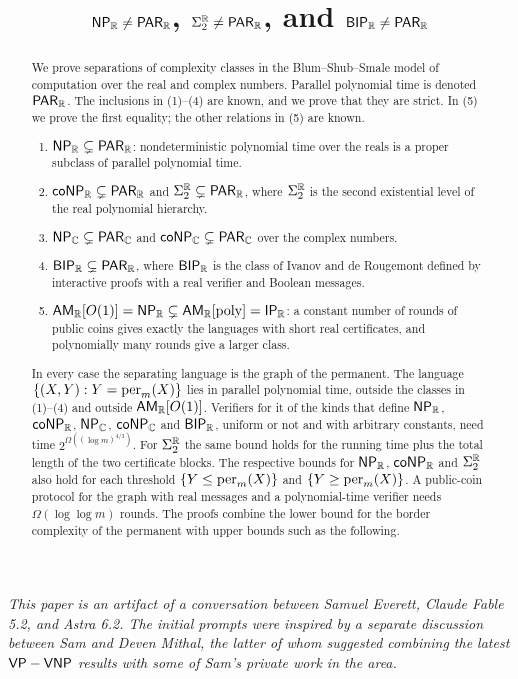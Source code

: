 \documentclass[11pt]{amsart}
\title{$\textsf{\upshape NP}_{\mathbb{R}}\neq\textsf{\upshape PAR}_{\mathbb{R}}$, $\Sigma_2^{\mathbb{R}}\neq\textsf{\upshape PAR}_{\mathbb{R}}$, and $\textsf{\upshape BIP}_{\mathbb{R}}\neq\textsf{\upshape PAR}_{\mathbb{R}}$}
\date{}
\theoremstyle{plain}
\theoremstyle{definition}
\theoremstyle{remark}
\begin{document}
\textit{This paper is an artifact of a conversation between Samuel Everett, Claude Fable 5.2, and Astra 6.2. The initial prompts were inspired by a separate discussion between Sam and Deven Mithal, the latter of whom suggested combining the latest $\textsf{\upshape VP}-\textsf{\upshape VNP}$ results with some of Sam's private work in the area.}

\begin{abstract}
We prove separations of complexity classes in the Blum--Shub--Smale model of computation over the real and complex numbers. Parallel polynomial time is denoted $\textsf{\upshape PAR}_{\mathbb{R}}$. The inclusions in \textup{(1)--(4)} are known, and we prove that they are strict. In \textup{(5)} we prove the first equality; the other relations in \textup{(5)} are known.
\begin{enumerate}[label=\textup{(\arabic*)},leftmargin=2.2em,itemsep=1pt,topsep=3pt]
\item $\textsf{\upshape NP}_{\mathbb{R}}\subsetneq\textsf{\upshape PAR}_{\mathbb{R}}$: nondeterministic polynomial time over the reals is a proper subclass of parallel polynomial time.
\item $\textsf{\upshape coNP}_{\mathbb{R}}\subsetneq\textsf{\upshape PAR}_{\mathbb{R}}$ and $\Sigma_2^{\mathbb{R}}\subsetneq\textsf{\upshape PAR}_{\mathbb{R}}$, where $\Sigma_2^{\mathbb{R}}$ is the second existential level of the real polynomial hierarchy.
\item $\textsf{\upshape NP}_{\mathbb{C}}\subsetneq\textsf{\upshape PAR}_{\mathbb{C}}$ and $\textsf{\upshape coNP}_{\mathbb{C}}\subsetneq\textsf{\upshape PAR}_{\mathbb{C}}$ over the complex numbers.
\item $\textsf{\upshape BIP}_{\mathbb{R}}\subsetneq\textsf{\upshape PAR}_{\mathbb{R}}$, where $\textsf{\upshape BIP}_{\mathbb{R}}$ is the class of Ivanov and de Rougemont defined by interactive proofs with a real verifier and Boolean messages.
\item $\textsf{\upshape AM}_{\mathbb{R}}[O(1)]=\textsf{\upshape NP}_{\mathbb{R}}\subsetneq\textsf{\upshape AM}_{\mathbb{R}}[\mathrm{poly}]=\textsf{\upshape IP}_{\mathbb{R}}$: a constant number of rounds of public coins gives exactly the languages with short real certificates, and polynomially many rounds give a larger class.
\end{enumerate}
In every case the separating language is the graph of the permanent. The language $\{(X,Y):Y=\operatorname{per}_m(X)\}$ lies in parallel polynomial time, outside the classes in \textup{(1)--(4)} and outside $\textsf{\upshape AM}_{\mathbb{R}}[O(1)]$. Verifiers for it of the kinds that define $\textsf{\upshape NP}_{\mathbb{R}}$, $\textsf{\upshape coNP}_{\mathbb{R}}$, $\textsf{\upshape NP}_{\mathbb{C}}$, $\textsf{\upshape coNP}_{\mathbb{C}}$ and $\textsf{\upshape BIP}_{\mathbb{R}}$, uniform or not and with arbitrary constants, need time $2^{\Omega((\log m)^{4/3})}$. For $\Sigma_2^{\mathbb{R}}$ the same bound holds for the running time plus the total length of the two certificate blocks. The respective bounds for $\textsf{\upshape NP}_{\mathbb{R}}$, $\textsf{\upshape coNP}_{\mathbb{R}}$ and $\Sigma_2^{\mathbb{R}}$ also hold for each threshold $\{Y\le\operatorname{per}_m(X)\}$ and $\{Y\ge\operatorname{per}_m(X)\}$. A public-coin protocol for the graph with real messages and a polynomial-time verifier needs $\Omega(\log\log m)$ rounds. The proofs combine the lower bound for the border complexity of the permanent with upper bounds such as the following.

\end{abstract}
\end{document}
